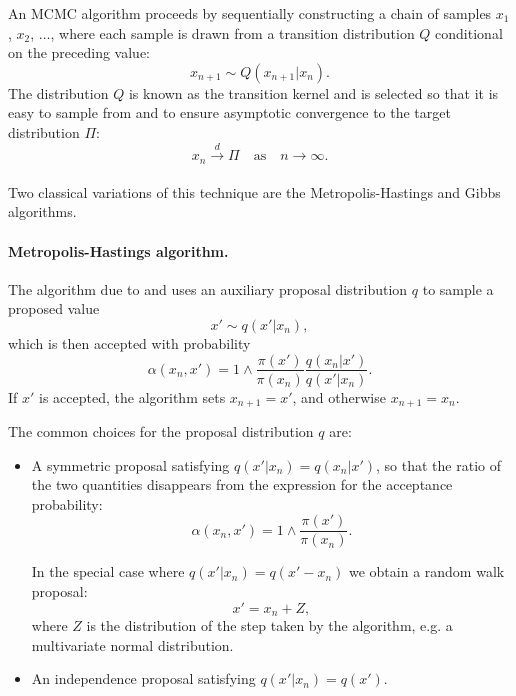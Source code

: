 \documentclass[12pt,a4paper]{report}
\begin{document}


An MCMC algorithm proceeds by sequentially constructing a chain of samples $x_1$, $x_2$, $\dots$,  where each sample is drawn from a transition distribution $Q$ conditional on the preceding value:
$$x_{n+1} \sim Q(x_{n+1}|x_n).$$
The distribution $Q$ is known as the transition kernel and is selected so that it is easy to sample from and to ensure asymptotic convergence to the target distribution $\Pi$:
$$x_n \xrightarrow[]{d} \Pi \quad\text{as}\quad n \to \infty.$$

Two classical variations of this technique are the Metropolis-Hastings and Gibbs algorithms.

\paragraph{Metropolis-Hastings algorithm.} The algorithm due to \cite{metropolisEquationStateCalculations1953} and \cite{hastingsMonteCarloSampling1970} uses an auxiliary proposal distribution $q$ to sample a proposed value
$$x' \sim q(x' | x_n),$$
which is then accepted with probability
$$\alpha(x_n, x') = 1 \wedge \frac{\pi(x')}{\pi(x_n)} \frac{q(x_n|x')}{q(x'|x_n)}.$$
If $x'$ is accepted, the algorithm sets $x_{n+1} = x'$, and otherwise $x_{n+1} = x_n$.


The common choices for the proposal distribution $q$ are:
\begin{itemize}
\item A symmetric proposal satisfying $q(x'|x_n) = q(x_n|x')$, so that the ratio of the two quantities disappears from the expression for the acceptance probability:
$$\alpha(x_n, x') = 1 \wedge \frac{\pi(x')}{\pi(x_n)}.$$

In the special case where $q(x'|x_n) = q(x' - x_n)$ we obtain a random walk proposal:
$$x' = x_n + Z,$$
where $Z$ is the distribution of the step taken by the algorithm, e.g. a multivariate normal distribution.

\item An independence proposal satisfying $q(x'|x_n) = q(x')$.

\end{itemize}
\end{document}
